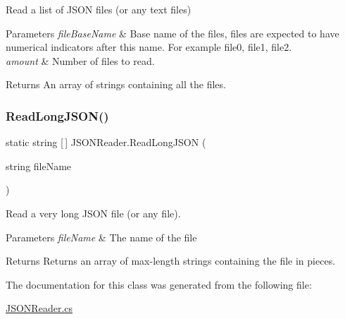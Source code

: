 Read a list of J\+S\+ON files (or any text files) 


\begin{DoxyParams}{Parameters}
{\em file\+Base\+Name} & Base name of the files, files are expected to have numerical indicators after this name. For example \textquotesingle{}file0\textquotesingle{}, \textquotesingle{}file1\textquotesingle{}, \textquotesingle{}file2\textquotesingle{}.\\
\hline
{\em amount} & Number of files to read.\\
\hline
\end{DoxyParams}
\begin{DoxyReturn}{Returns}
An array of strings containing all the files. 
\end{DoxyReturn}
\mbox{\label{class_j_s_o_n_reader_a357e6392396016b03de0a61951d31fc4}} 
\subsubsection{\texorpdfstring{ReadLongJSON()}{ReadLongJSON()}}
{\footnotesize\ttfamily static string \mbox{[}$\,$\mbox{]} J\+S\+O\+N\+Reader.\+Read\+Long\+J\+S\+ON (\begin{DoxyParamCaption}\item[{string}]{file\+Name }\end{DoxyParamCaption})\hspace{0.3cm}{\ttfamily [static]}}



Read a very long J\+S\+ON file (or any file). 


\begin{DoxyParams}{Parameters}
{\em file\+Name} & The name of the file\\
\hline
\end{DoxyParams}
\begin{DoxyReturn}{Returns}
Returns an array of max-\/length strings containing the file in pieces.
\end{DoxyReturn}


The documentation for this class was generated from the following file\+:\begin{DoxyCompactItemize}
\item 
\mbox{\hyperlink{_j_s_o_n_reader_8cs}{J\+S\+O\+N\+Reader.\+cs}}\end{DoxyCompactItemize}
